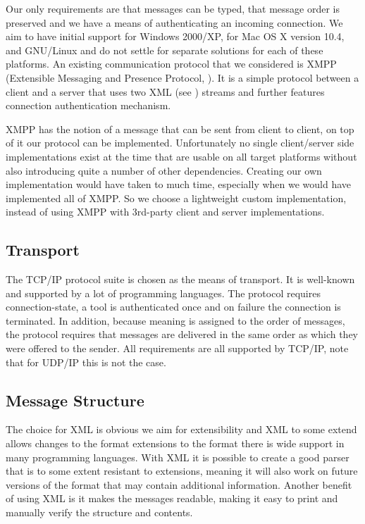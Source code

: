 \documentclass{article}
\begin{document}
   Our only requirements are that messages can be typed, that message order is
   preserved and we have a means of authenticating an incoming connection. We
   aim to have initial support for Windows 2000/XP, for Mac OS X version 10.4,
   and GNU/Linux and do not settle for separate solutions for each of these
   platforms. An existing communication protocol that we considered is XMPP
   (Extensible Messaging and Presence Protocol, \cite{rfc3920}). It is a simple
   protocol between a client and a server that uses two XML (see
   \cite{Sperberg-McQueen:06:EML}) streams and further features connection
   authentication mechanism.

   XMPP has the notion of a message that can be sent from client to client, on
   top of it our protocol can be implemented.   Unfortunately no single
   client/server side implementations exist at the time that are usable on all
   target platforms without also introducing quite a number of other
   dependencies. Creating our own implementation would have taken to much time,
   especially when we would have implemented all of XMPP.  So we choose a lightweight
   custom implementation, instead of using XMPP with 3rd-party client and
   server implementations.

  \subsection{Transport}

   \noindent The TCP/IP protocol suite is chosen as the means of transport. It is
   well-known and supported by a lot of programming languages. The protocol
   requires connection-state, a tool is authenticated once and on failure the
   connection is terminated. In addition, because meaning is assigned to the
   order of messages, the protocol requires that messages are delivered in the
   same order as which they were offered to the sender. All requirements are
   all supported by TCP/IP, note that for UDP/IP this is not the case.

  \subsection{Message Structure}

   \noindent The choice for XML is obvious we aim for extensibility and XML to some
   extend allows changes to the format extensions to the format there is wide
   support in many programming languages. With XML it is possible to create a
   good parser that is to some extent resistant to extensions, meaning it will
   also work on future versions of the format that may contain additional
   information.  Another benefit of using XML is it makes the messages
   readable, making it easy to print and manually verify the structure and
   contents.
\end{document}
